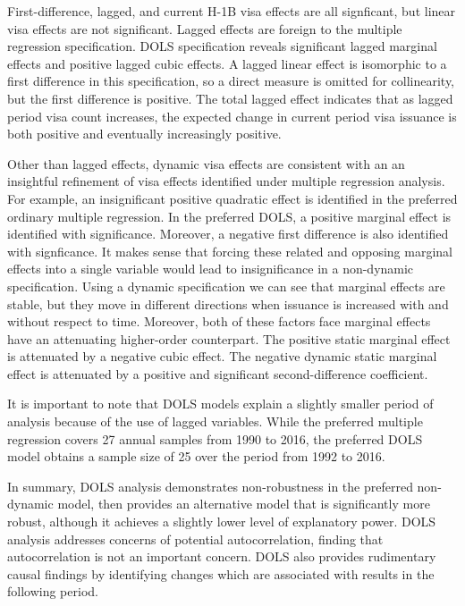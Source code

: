 \documentclass[review]{elsarticle}
\begin{document}
First-difference, lagged, and current H-1B visa effects are all signficant,
but linear visa effects are not significant.
Lagged effects are foreign to the multiple regression specification.
DOLS specification reveals significant lagged marginal effects and positive
lagged cubic effects.
A lagged linear effect is isomorphic to a first difference in this specification,
so a direct measure is omitted for collinearity,
but the first difference is positive.
The total lagged effect indicates that as lagged period visa count increases,
the expected change in current period visa issuance is both positive and eventually increasingly positive.

Other than lagged effects, dynamic visa effects are consistent with an an insightful refinement of
visa effects identified under multiple regression analysis.
For example, an insignificant positive quadratic effect is identified in the preferred ordinary multiple regression.
In the preferred DOLS, a positive marginal effect is identified with significance.
Moreover, a negative first difference is also identified with signficance.
It makes sense that forcing these related and opposing marginal effects into a single variable would lead
to insignificance in a non-dynamic specification.
Using a dynamic specification we can see that marginal effects are stable,
but they move in different directions when issuance is increased with and without respect to time.
Moreover, both of these factors face marginal effects have an attenuating higher-order counterpart.
The positive static marginal effect is attenuated by a negative cubic effect.
The negative dynamic static marginal effect is attenuated by a positive and significant second-difference coefficient.

It is important to note that DOLS models explain a slightly smaller period of analysis because of the use of lagged variables.
While the preferred multiple regression covers 27 annual samples from 1990 to 2016,
the preferred DOLS model obtains a sample size of 25 over the period from 1992 to 2016.

In summary, DOLS analysis demonstrates non-robustness in the preferred non-dynamic model,
then provides an alternative model that is significantly more robust, although it
achieves a slightly lower level of explanatory power.
DOLS analysis addresses concerns of potential autocorrelation,
finding that autocorrelation is not an important concern.
DOLS also provides rudimentary causal findings by identifying changes which are associated with results in the following period.
\end{document}
